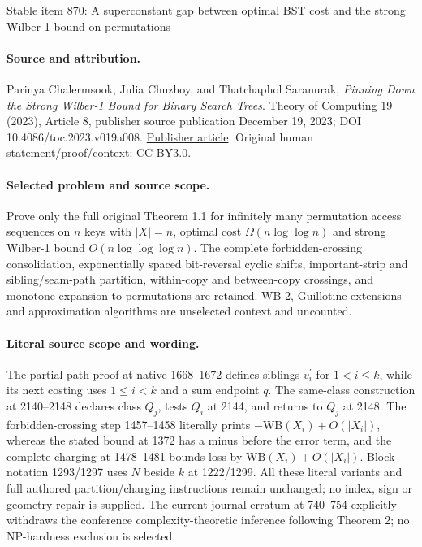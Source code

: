 \documentclass[11pt]{article}
\numberwithin{equation}{section}
\theoremstyle{definition}
\theoremstyle{plain}
\begin{document}
\begin{center}{\Large Stable item 870: A superconstant gap between optimal BST cost and the strong Wilber-1 bound on permutations}\end{center}
\paragraph{Source and attribution.}
Parinya Chalermsook, Julia Chuzhoy, and Thatchaphol Saranurak, \emph{Pinning Down the Strong Wilber-1 Bound for Binary Search Trees}. Theory of Computing 19 (2023), Article 8, publisher source publication December 19, 2023; DOI 10.4086/toc.2023.v019a008. \href{https://theoryofcomputing.org/articles/v019a008/}{Publisher article}. Original human statement/proof/context: \href{https://creativecommons.org/licenses/by/3.0/}{CC BY3.0}.
\paragraph{Selected problem and source scope.}
Prove only the full original Theorem 1.1 for infinitely many permutation access sequences on \(n\) keys with \(|X|=n\), optimal cost \(\Omega(n\log\log n)\) and strong Wilber-1 bound \(O(n\log\log\log n)\). The complete forbidden-crossing consolidation, exponentially spaced bit-reversal cyclic shifts, important-strip and sibling/seam-path partition, within-copy and between-copy crossings, and monotone expansion to permutations are retained. WB-2, Guillotine extensions and approximation algorithms are unselected context and uncounted.
\paragraph{Literal source scope and wording.}
The partial-path proof at native 1668–1672 defines siblings \(v_i^\prime\) for \(1<i\leq k\), while its next costing uses \(1\leq i<k\) and a sum endpoint \(q\). The same-class construction at 2140–2148 declares class \(Q_j\), tests \(Q_i\) at 2144, and returns to \(Q_j\) at 2148. The forbidden-crossing step 1457–1458 literally prints \(-\mathrm{WB}(X_i)+O(|X_i|)\), whereas the stated bound at 1372 has a minus before the error term, and the complete charging at 1478–1481 bounds loss by \(\mathrm{WB}(X_i)+O(|X_i|)\). Block notation 1293/1297 uses \(N\) beside \(k\) at 1222/1299. All these literal variants and full authored partition/charging instructions remain unchanged; no index, sign or geometry repair is supplied. The current journal erratum at 740–754 explicitly withdraws the conference complexity-theoretic inference following Theorem 2; no NP-hardness exclusion is selected.
\end{document}
